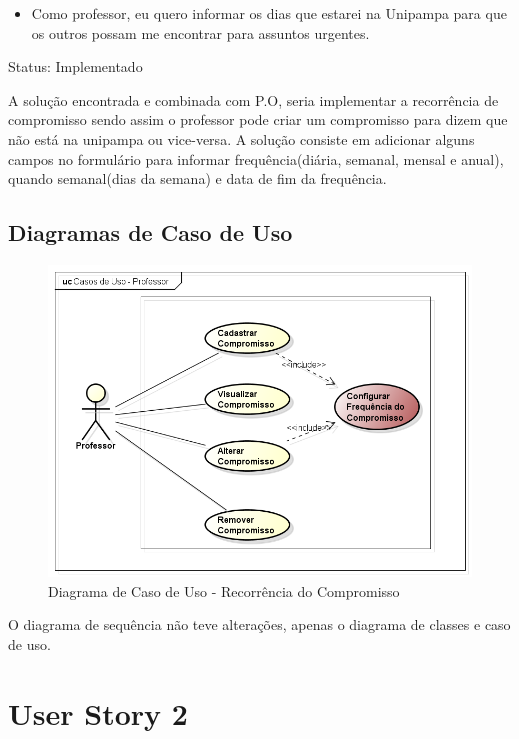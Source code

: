 \documentclass{abnt}
\begin{document}
		\begin{itemize}
			\item Como professor, eu quero informar os dias que estarei na Unipampa para que os outros possam me encontrar para assuntos urgentes.
		\end{itemize}
		
		Status: Implementado
		
		A solução encontrada e combinada com P.O, seria implementar a recorrência de compromisso sendo assim o professor pode criar um compromisso para dizem que não está na unipampa ou vice-versa. A solução consiste em adicionar alguns campos no formulário para informar frequência(diária, semanal, mensal e anual), quando semanal(dias da semana) e data de fim da frequência.
		
		\subsection{Diagramas de Caso de Uso}	
		\begin{figure}[h]
			\begin{center}
				 \includegraphics[width=500px]{CasoUsoDiasAusencia}
				 \caption{Diagrama de Caso de Uso - Recorrência do Compromisso}
				 \label{fig:CasoUsoDiasAusencia}
			\end{center}
		\end{figure}
		\FloatBarrier
		
		O diagrama de sequência não teve alterações, apenas o diagrama de classes e caso de uso.
		
	
	\clearpage	
	\section{User Story 2}
\end{document}
